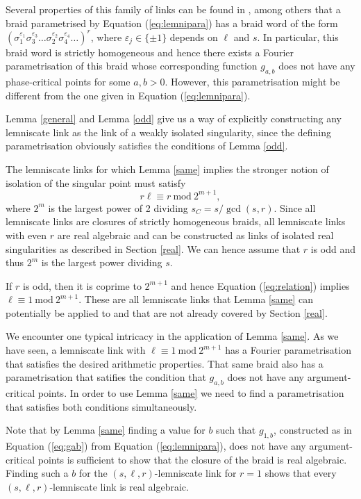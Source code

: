 \documentclass[notitlepage,12pt]{revtex4-1}
\begin{document}
Several properties of this family of links can be found in \cite{bode:2016lemniscate}, among others that a braid parametrised by Equation (\ref{eq:lemnipara}) has a braid word of the form $(\sigma_{1}^{\varepsilon_{1}}\sigma_{3}^{\varepsilon_{3}}\ldots\sigma_{2}^{\varepsilon_{2}}\sigma_{4}^{\varepsilon_{4}}\ldots)^{r}$, where $\varepsilon_{j}\in\{\pm1\}$ depends on $\ell$ and $s$. In particular, this braid word is strictly homogeneous and hence there exists a Fourier parametrisation of this braid whose corresponding function $g_{a,b}$ does not have any phase-critical points for some $a,b>0$. However, this parametrisation might be different from the one given in Equation (\ref{eq:lemnipara}).

Lemma \ref{general} and Lemma \ref{odd} give us a way of explicitly constructing any lemniscate link as the link of a weakly isolated singularity, since the defining parametrisation obviously satisfies the conditions of Lemma \ref{odd}.

The lemniscate links for which Lemma \ref{same} implies the stronger notion of isolation of the singular point must satisfy 
\begin{equation}
\label{eq:relation}
r\ell\equiv r\ \mathrm{mod}\  2^{m+1},
\end{equation} 
where $2^m$ is the largest power of 2 dividing $s_{C}=s/\gcd(s,r)$. Since all lemniscate links are closures of strictly homogeneous braids, all lemniscate links with even $r$ are real algebraic and can be constructed as links of isolated real singularities as described in Section \ref{real}. We can hence assume that $r$ is odd and thus $2^m$ is the largest power dividing $s$.

If $r$ is odd, then it is coprime to $2^{m+1}$ and hence Equation (\ref{eq:relation}) implies $\ell\equiv 1\ \mathrm{mod}\  2^{m+1}$. These are all lemniscate links that Lemma \ref{same} can potentially be applied to and that are not already covered by Section \ref{real}.

We encounter one typical intricacy in the application of Lemma \ref{same}. As we have seen, a lemniscate link with $\ell\equiv 1\ \mathrm{mod}\  2^{m+1}$ has a Fourier parametrisation that satisfies the desired arithmetic properties. That same braid also has a parametrisation that satifies the condition that $g_{a,b}$ does not have any argument-critical points. In order to use Lemma \ref{same} we need to find a parametrisation that satisfies both conditions simultaneously.

Note that by Lemma \ref{same} finding a value for $b$ such that $g_{1,b}$, constructed as in Equation (\ref{eq:gab}) from Equation (\ref{eq:lemnipara}), does not have any argument-critical points is sufficient to show that the closure of the braid is real algebraic.
Finding such a $b$ for the $(s,\ell,r)$-lemniscate link for $r=1$ shows that every $(s,\ell,r)$-lemniscate link is real algebraic.
\end{document}
